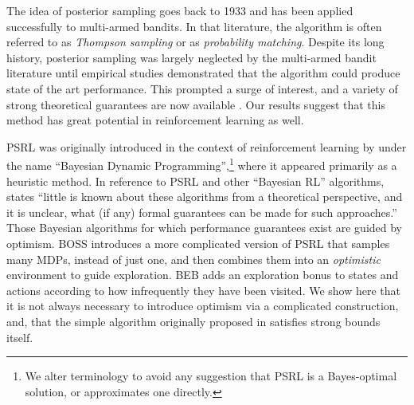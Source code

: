 The idea of posterior sampling goes back to 1933 \cite{thompson1933} and has been applied successfully to multi-armed bandits. In that literature, the algorithm is often referred to as {\it Thompson sampling} or as {\it probability matching}. Despite its long history, posterior sampling was largely neglected by the multi-armed bandit literature until empirical studies \cite{chapelle2011empirical, scott2010modern} demonstrated that the algorithm could produce state of the art performance. This prompted a surge of interest, and a variety of strong theoretical guarantees are now available \cite{agrawal2012further, agrawal2013linear, kaufmann2012thompson, russo2013}. Our results suggest that this method has great potential in reinforcement learning as well.

PSRL was originally introduced in the context of reinforcement learning by \cite{strens2000bayesian} under the name ``Bayesian Dynamic Programming'',\footnote{We alter terminology to avoid any suggestion that PSRL is a Bayes-optimal solution, or approximates one directly.}
where it appeared primarily as a heuristic method.  In reference to PSRL and other ``Bayesian RL'' algorithms, \cite{kolter2009near} states ``little is known about these algorithms from a theoretical perspective, and it is unclear, what (if any) formal guarantees can be made for such approaches.''
Those Bayesian algorithms for which performance guarantees exist are guided by optimism. BOSS \cite{wang2005bayesian} introduces a more complicated version of PSRL that samples many MDPs, instead of just one, and then combines them into an \emph{optimistic} environment to guide exploration. BEB \cite{kolter2009near} adds an exploration bonus to states and actions according to how infrequently they have been visited. We show here that it is not always necessary to introduce optimism via a complicated construction, and, that the simple algorithm originally proposed in \cite{strens2000bayesian} satisfies strong bounds itself.

